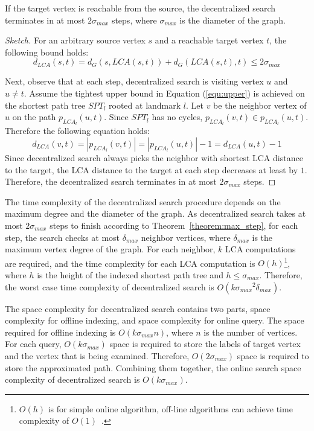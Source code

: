 \begin{theorem}
\label{theorem:max_step}
If the target vertex is reachable from the source, the decentralized search terminates in at most $2{\sigma}_{max}$ steps, where ${\sigma}_{max}$ is the diameter of the graph.
\end{theorem}
\begin{proof}[Sketch]
For an arbitrary source vertex $s$ and a reachable target vertex $t$, the following bound holds:
\[
    d_{LCA}(s,t) = d_G(s,LCA(s,t)) + d_G(LCA(s,t),t) \leq 2{\sigma}_{max}
\]

Next, observe that at each step, decentralized search is visiting vertex $u$ and $u \neq t$. Assume the tightest upper bound in Equation (\ref{equ:upper}) is achieved on the shortest path tree $SPT_l$ rooted at landmark $l$. Let $v$ be the neighbor vertex of $u$ on the path $p_{LCA_l}(u,t)$. Since $SPT_l$ has no cycles, $p_{LCA_l}(v,t) \in p_{LCA_l}(u,t)$. Therefore the following equation holds:
\[
		d_{LCA}(v,t) = |p_{LCA_l}(v,t)| = |p_{LCA_l}(u,t)| - 1 = d_{LCA}(u,t) - 1
\]
Since decentralized search always picks the neighbor with shortest LCA distance to the target, the LCA distance to the target at each step decreases at least by $1$. Therefore, the decentralized search terminates in at most $2{\sigma}_{max}$ steps.
\end{proof}

The time complexity of the decentralized search procedure depends on the maximum degree and the diameter of the graph. As decentralized search takes at most $2{\sigma}_{max}$ steps to finish according to Theorem~\ref{theorem:max_step}, for each step, the search checks at most ${\delta}_{max}$ neighbor vertices, where ${\delta}_{max}$ is the maximum vertex degree of the graph. For each neighbor, $k$ LCA computations are required, and the time complexity for each LCA computation is $O(h)$\footnote{$O(h)$ is for simple online algorithm, off-line algorithms can achieve time complexity of $O(1)$~\cite{bender2000lca}.}, where $h$ is the height of the indexed shortest path tree and $h \leq {\sigma}_{max}$. Therefore, the worst case time complexity of decentralized search is $O(k{{\sigma}_{max}}^2{\delta}_{max})$. 

The space complexity for decentralized search contains two parts, space complexity for offline indexing, and space complexity for online query. The space required for offline indexing is $O(k{\sigma}_{max}n)$, where $n$ is the number of vertices. For each query, $O(k{\sigma}_{max})$ space is required to store the labels of target vertex and the vertex that is being examined. Therefore, $O(2{\sigma}_{max})$ space is required to store the approximated path. Combining them together, the online search space complexity of decentralized search is $O(k{\sigma}_{max})$.

